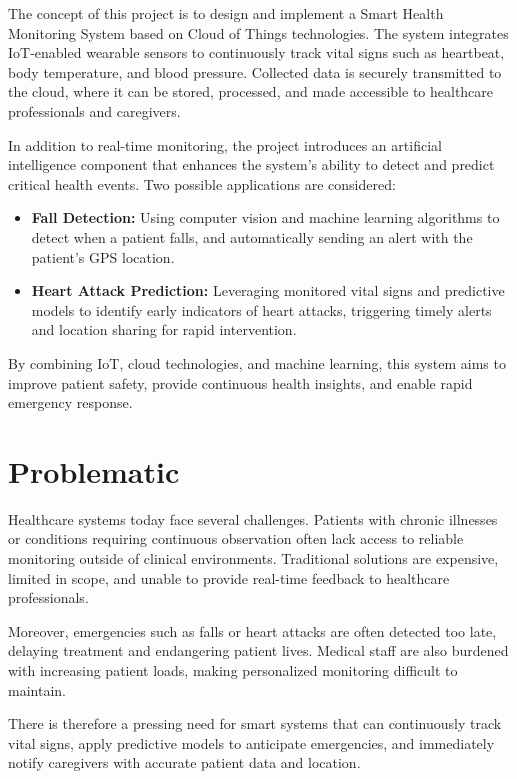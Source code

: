 The concept of this project is to design and implement a Smart Health Monitoring System 
based on Cloud of Things technologies. The system integrates IoT-enabled wearable sensors 
to continuously track vital signs such as heartbeat, body temperature, and blood pressure. 
Collected data is securely transmitted to the cloud, where it can be stored, processed, 
and made accessible to healthcare professionals and caregivers. 

In addition to real-time monitoring, the project introduces an artificial intelligence component 
that enhances the system's ability to detect and predict critical health events. 
Two possible applications are considered:
\begin{itemize}
    \item \textbf{Fall Detection:} Using computer vision and machine learning algorithms to detect when a patient falls, 
    and automatically sending an alert with the patient's GPS location.
    \item \textbf{Heart Attack Prediction:} Leveraging monitored vital signs and predictive models 
    to identify early indicators of heart attacks, triggering timely alerts and location sharing for rapid intervention.
\end{itemize}

By combining IoT, cloud technologies, and machine learning, this system aims to improve 
patient safety, provide continuous health insights, and enable rapid emergency response.

\section{Problematic}

Healthcare systems today face several challenges. 
Patients with chronic illnesses or conditions requiring continuous observation 
often lack access to reliable monitoring outside of clinical environments. 
Traditional solutions are expensive, limited in scope, and unable to provide real-time 
feedback to healthcare professionals. 

Moreover, emergencies such as falls or heart attacks are often detected too late, 
delaying treatment and endangering patient lives. 
Medical staff are also burdened with increasing patient loads, 
making personalized monitoring difficult to maintain. 

There is therefore a pressing need for smart systems that can continuously track vital signs, 
apply predictive models to anticipate emergencies, and immediately notify caregivers 
with accurate patient data and location.

